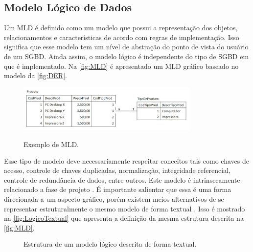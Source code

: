     \subsection{Modelo Lógico de Dados} \label{ssec:ModelLogico}

Um \ac{MLD} é definido como um modelo que possui a representação dos objetos, relacionamentos e características de acordo com regras de implementação. 
Isso significa que esse modelo tem um nível de abstração do ponto de vista do usuário de um \ac{SGBD}. 
Ainda assim, o modelo lógico é independente do tipo de \ac{SGBD} em que é implementado. 
Na \autoref{fig:MLD} é apresentado um \ac{MLD} gráfico baseado no modelo da \autoref{fig:DER}.

\begin{figure}[htb]
	\centering
	\caption{Exemplo de MLD.}
		\includegraphics[width=0.8\textwidth]{img/MLD.jpg}
	\label{fig:MLD}
\end{figure}

Esse tipo de modelo deve necessariamente respeitar conceitos tais como chaves de acesso, controle de chaves duplicadas, normalização, integridade referencial, controle de redundância de dados, entre outros. 
Este modelo é intrinsecamente relacionado a fase de projeto \cite{Cougo:2013}. 
É importante salientar que essa é uma forma direcionada a um aspecto gráfico, porém existem meios alternativos de se representar estruturalmente o mesmo modelo de forma textual \cite{Martelli:2018}. 
Isso é mostrado na \autoref{fig:LogicoTextual} que apresenta a definição da mesma estrutura descrita na \autoref{fig:MLD}.

\begin{figure}[!htb]
    \caption{Estrutura de um modelo lógico descrita de forma textual.}
    \label{fig:LogicoTextual}
    \centering
\end{figure}

